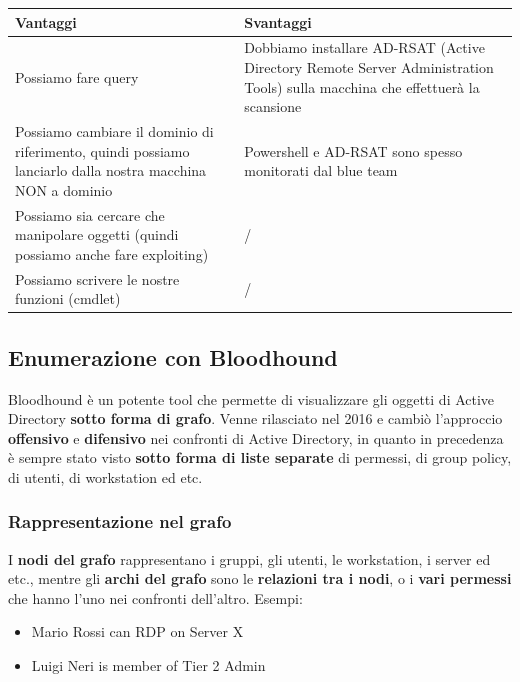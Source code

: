 \documentclass{article}
\begin{document}
\begin{table}[H]
	\centering
	\begin{tabular}{|m{7cm}|m{7cm}|}
		\hline
		\textbf{Vantaggi} & \textbf{Svantaggi} \\
		\hline
		Possiamo fare query & Dobbiamo installare AD-RSAT (Active Directory Remote Server Administration Tools) sulla macchina che effettuerà la scansione \\
		\hline
		Possiamo cambiare il dominio di riferimento, quindi possiamo lanciarlo dalla nostra macchina NON a dominio & Powershell e AD-RSAT sono spesso monitorati dal blue team \\
		\hline
		Possiamo sia cercare che manipolare oggetti (quindi possiamo anche fare exploiting) & \quad\quad\quad\quad\quad\quad\quad\quad\quad/ \\
		\hline
		Possiamo scrivere le nostre funzioni (cmdlet) & \quad\quad\quad\quad\quad\quad\quad\quad\quad/ \\
		\hline
	\end{tabular}
\end{table}

\subsection{Enumerazione con Bloodhound}
Bloodhound è un potente tool che permette di visualizzare gli oggetti di Active Directory \textbf{sotto forma di grafo}. Venne rilasciato nel 2016 e cambiò l'approccio \textbf{offensivo} e \textbf{difensivo} nei confronti di Active Directory, in quanto in precedenza è sempre stato visto \textbf{sotto forma di liste separate} di permessi, di group policy, di utenti, di workstation ed etc.

\subsubsection{Rappresentazione nel grafo}
I \textbf{nodi del grafo} rappresentano i gruppi, gli utenti, le workstation, i server ed etc., mentre gli \textbf{archi del grafo} sono le \textbf{relazioni tra i nodi}, o i \textbf{vari permessi} che hanno l'uno nei confronti dell’altro. Esempi:
\begin{itemize}
	\item Mario Rossi can RDP on Server X
	\item Luigi Neri is member of Tier 2 Admin
\end{itemize}
\end{document}

